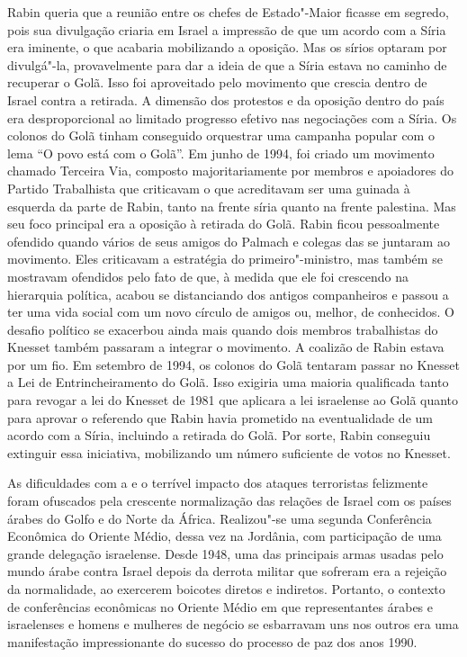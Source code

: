 Rabin queria que a reunião entre os chefes de Estado"-Maior ficasse em
segredo, pois sua divulgação criaria em Israel a impressão de que um
acordo com a Síria era iminente, o que acabaria mobilizando a oposição.
Mas os sírios optaram por divulgá"-la, provavelmente para dar a ideia de
que a Síria estava no caminho de recuperar o Golã. Isso foi aproveitado
pelo movimento que crescia dentro de Israel contra a retirada. A
dimensão dos protestos e da oposição dentro do país era desproporcional
ao limitado progresso efetivo nas negociações com a Síria. Os colonos do
Golã tinham conseguido orquestrar uma campanha popular com o lema ``O
povo está com o Golã''. Em junho de 1994, foi criado um movimento
chamado Terceira Via, composto majoritariamente por membros e apoiadores
do Partido Trabalhista que criticavam o que acreditavam ser uma guinada
à esquerda da parte de Rabin, tanto na frente síria quanto na frente
palestina. Mas seu foco principal era a oposição à retirada do Golã.
Rabin ficou pessoalmente ofendido quando vários de seus amigos do
Palmach e colegas das  se juntaram ao movimento. Eles criticavam a
estratégia do primeiro"-ministro, mas também se mostravam ofendidos pelo
fato de que, à medida que ele foi crescendo na hierarquia política, acabou se
distanciando dos antigos companheiros e passou a ter uma vida social com
um novo círculo de amigos ou, melhor, de conhecidos. O desafio político
se exacerbou ainda mais quando dois membros trabalhistas do Knesset
também passaram a integrar o movimento. A coalizão de Rabin estava por
um fio. Em setembro de 1994, os colonos do Golã tentaram passar no
Knesset a Lei de Entrincheiramento do Golã. Isso exigiria uma maioria
qualificada tanto para revogar a lei do Knesset de 1981 que aplicara a
lei israelense ao Golã quanto para aprovar o referendo que Rabin havia
prometido na eventualidade de um acordo com a Síria, incluindo a
retirada do Golã. Por sorte, Rabin conseguiu extinguir essa iniciativa,
mobilizando um número suficiente de votos no Knesset.

As dificuldades com a  e o terrível impacto dos ataques terroristas
felizmente foram ofuscados pela crescente normalização das relações de
Israel com os países árabes do Golfo e do Norte da África. Realizou"-se
uma segunda Conferência Econômica do Oriente Médio, dessa vez na
Jordânia, com participação de uma grande delegação israelense. Desde
1948, uma das principais armas usadas pelo mundo árabe contra Israel
depois da derrota militar que sofreram era a rejeição da normalidade, ao
exercerem boicotes diretos e indiretos. Portanto, o contexto de
conferências econômicas no Oriente Médio em que representantes árabes e
israelenses e homens e mulheres de negócio se esbarravam uns nos outros
era uma manifestação impressionante do sucesso do processo de paz dos
anos 1990.

